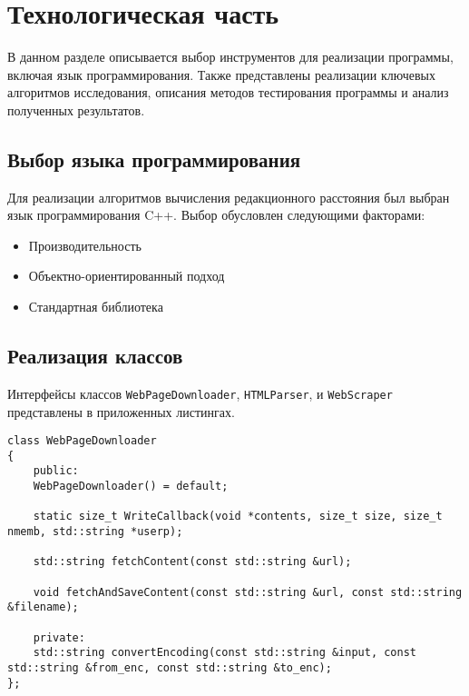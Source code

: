 \chapter{Технологическая часть}
В данном разделе описывается выбор инструментов для реализации программы, включая язык программирования. Также представлены реализации ключевых алгоритмов исследования, описания методов тестирования программы и анализ полученных результатов.

\section{Выбор языка программирования}

Для реализации алгоритмов вычисления редакционного расстояния был выбран язык программирования C++. Выбор обусловлен следующими факторами:

\begin{itemize}
	\item {Производительность}
	\item {Объектно-ориентированный подход}
	\item {Стандартная библиотека}
\end{itemize}

\section{Реализация классов}
Интерфейсы классов \texttt{WebPageDownloader}, \texttt{HTMLParser}, и \texttt{WebScraper} представлены в приложенных листингах.

\begin{center}
	\captionsetup{justification=raggedright,singlelinecheck=off}
	\begin{lstlisting}[caption=Интерфейс класса WebPageDownloader]
class WebPageDownloader
{
	public:
	WebPageDownloader() = default;
	
	static size_t WriteCallback(void *contents, size_t size, size_t nmemb, std::string *userp);
	
	std::string fetchContent(const std::string &url);
	
	void fetchAndSaveContent(const std::string &url, const std::string &filename);
	
	private:
	std::string convertEncoding(const std::string &input, const std::string &from_enc, const std::string &to_enc);
};
	\end{lstlisting}
\end{center}

